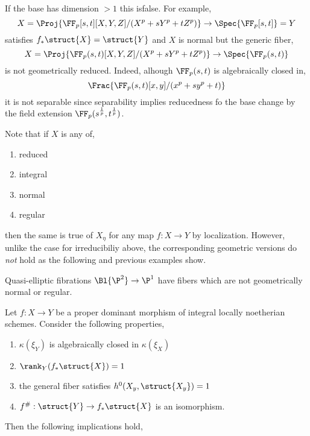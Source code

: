\documentclass[12pt]{article}
\begin{document}
\begin{example}
If the base has dimension $> 1$ this isfalse. For example,
\[ X = \Proj{\FF_p[s,t][X,Y,Z]/(X^p + s Y^p + t Z^p)} \to \Spec{\FF_p[s,t]}= Y \]
satisfies $f_* \struct{X} = \struct{Y}$ and $X$ is normal but the generic fiber,
\[ X = \Proj{\FF_p(s,t)[X,Y,Z]/(X^p + s Y^p + t Z^p)} \to \Spec{\FF_p(s,t)} \]
is not geometrically reduced. Indeed, alhough $\FF_p(s,t)$ is algebraically closed in,
\[ \Frac{\FF_p(s,t)[x,y]/(x^p + s y^p + t)} \]
it is not separable since separability implies reducedness fo the base change by the field extension $\FF_p(s^{\frac{1}{p}}, t^{\frac{1}{p}})$.
\end{example}

\begin{rmk}
Note that if $X$ is any of,
\begin{enumerate}
\item reduced
\item integral
\item normal
\item regular
\end{enumerate}
then the same is true of $X_\eta$ for any map $f : X \to Y$ by localization. However, unlike the case for irreducibiliy above, the corresponding geometric versions do \textit{not} hold as the following and previous examples show. 
\end{rmk}

\begin{example}
Quasi-elliptic fibrations $\Bl{\P^2} \to \P^1$ have fibers which are not geometrically normal or regular.
\end{example}

\begin{theorem}[Fujita, 1982]
Let $f : X \to Y$ be a proper dominant morphism of integral locally noetherian schemes. Consider the following properties,
\begin{enumerate}
\item $\kappa(\xi_Y)$ is algebraically closed in $\kappa(\xi_X)$
\item $\rank_Y(f_* \struct{X}) = 1$
\item the general fiber satisfies $h^0(X_y, \struct{X_y}) = 1$
\item $f^{\#} : \struct{Y} \to f_* \struct{X}$ is an isomorphism.
\end{enumerate}
Then the following implications hold,
\begin{center}
\end{center}
\end{theorem}
\end{document}
